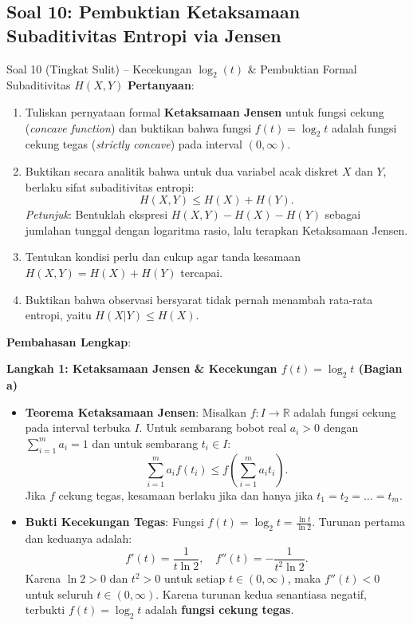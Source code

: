 \documentclass[11pt,a4paper]{article}
\begin{document}
\vspace{0.4cm}

\subsection{Soal 10: Pembuktian Ketaksamaan Subaditivitas Entropi via Jensen}

\begin{soalsulit}{Soal 10 (Tingkat Sulit) -- Kecekungan $\log_2(t)$ \& Pembuktian Formal Subaditivitas $H(X,Y)$}
\textbf{Pertanyaan}:
\begin{enumerate}[label=\alph*)]
    \item Tuliskan pernyataan formal \textbf{Ketaksamaan Jensen} untuk fungsi cekung (\textit{concave function}) dan buktikan bahwa fungsi $f(t) = \log_2 t$ adalah fungsi cekung tegas (\textit{strictly concave}) pada interval $(0, \infty)$.
    \item Buktikan secara analitik bahwa untuk dua variabel acak diskret $X$ dan $Y$, berlaku sifat subaditivitas entropi:
    \[
    H(X, Y) \le H(X) + H(Y).
    \]
    \textit{Petunjuk}: Bentuklah ekspresi $H(X, Y) - H(X) - H(Y)$ sebagai jumlahan tunggal dengan logaritma rasio, lalu terapkan Ketaksamaan Jensen.
    \item Tentukan kondisi perlu dan cukup agar tanda kesamaan $H(X, Y) = H(X) + H(Y)$ tercapai.
    \item Buktikan bahwa observasi bersyarat tidak pernah menambah rata-rata entropi, yaitu $H(X|Y) \le H(X)$.
\end{enumerate}
\end{soalsulit}

\noindent\textbf{Pembahasan Lengkap}:

\noindent\textbf{Langkah 1: Ketaksamaan Jensen \& Kecekungan $f(t) = \log_2 t$ (Bagian a)}
\begin{itemize}
    \item \textbf{Teorema Ketaksamaan Jensen}: Misalkan $f: I \to \mathbb{R}$ adalah fungsi cekung pada interval terbuka $I$. Untuk sembarang bobot real $a_i > 0$ dengan $\sum_{i=1}^m a_i = 1$ dan untuk sembarang $t_i \in I$:
    \begin{equation}
    \label{eq:jensen_app}
    \sum_{i=1}^m a_i f(t_i) \le f\left( \sum_{i=1}^m a_i t_i \right).
    \end{equation}
    Jika $f$ cekung tegas, kesamaan berlaku jika dan hanya jika $t_1 = t_2 = \dots = t_m$.
    \item \textbf{Bukti Kecekungan Tegas}:
    Fungsi $f(t) = \log_2 t = \frac{\ln t}{\ln 2}$. Turunan pertama dan keduanya adalah:
    \[
    f'(t) = \frac{1}{t \ln 2}, \quad f''(t) = -\frac{1}{t^2 \ln 2}.
    \]
    Karena $\ln 2 > 0$ dan $t^2 > 0$ untuk setiap $t \in (0, \infty)$, maka $f''(t) < 0$ untuk seluruh $t \in (0, \infty)$. Karena turunan kedua senantiasa negatif, terbukti $f(t) = \log_2 t$ adalah \textbf{fungsi cekung tegas}.
\end{itemize}
\end{document}

